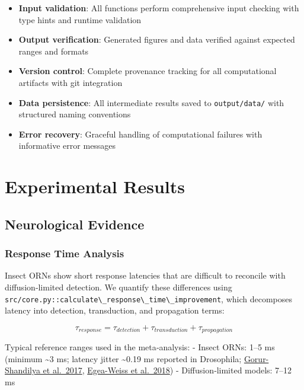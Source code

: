 \documentclass[
  13pt,
  a4paperpaper,
  12pt]{article}
\newcommand{\passthrough}[1]{#1}
\providecommand{\tightlist}{%
  \setlength{\itemsep}{0pt}\setlength{\parskip}{0pt}}
\let\oldsection\section
\renewcommand{\section}{\clearpage\oldsection}
\begin{document}
\begin{itemize}
\tightlist
\item
  \textbf{Input validation}: All functions perform comprehensive input
  checking with type hints and runtime validation
\item
  \textbf{Output verification}: Generated figures and data verified
  against expected ranges and formats
\item
  \textbf{Version control}: Complete provenance tracking for all
  computational artifacts with git integration
\item
  \textbf{Data persistence}: All intermediate results saved to
  \passthrough{\lstinline!output/data/!} with structured naming
  conventions
\item
  \textbf{Error recovery}: Graceful handling of computational failures
  with informative error messages
\end{itemize}

\section{Experimental Results}\label{sec:experimental_results}

\subsection{Neurological Evidence}\label{neurological-evidence}

\subsubsection{Response Time Analysis}\label{response-time-analysis}

Insect ORNs show short response latencies that are difficult to
reconcile with diffusion‑limited detection. We quantify these
differences using
\passthrough{\lstinline!src/core.py::calculate\_response\_time\_improvement!},
which decomposes latency into detection, transduction, and propagation
terms:

\begin{equation}
\tau_{response} = \tau_{detection} + \tau_{transduction} + \tau_{propagation}
\label{eq:response_time_components}
\end{equation}

Typical reference ranges used in the meta‑analysis: - Insect ORNs: 1--5
ms (minimum \textasciitilde3 ms; latency jitter \textasciitilde0.19 ms
reported in Drosophila;
\href{https://elifesciences.org/articles/27670}{Gorur-Shandilya et
al.~2017},
\href{https://pmc.ncbi.nlm.nih.gov/articles/PMC6147046/}{Egea-Weiss et
al.~2018}) - Diffusion‑limited models: 7--12 ms
\end{document}
